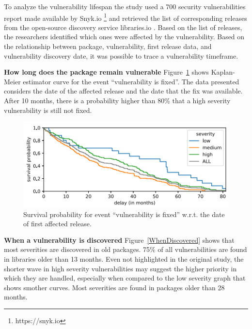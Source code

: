 \documentclass[pdf,bookmarks,colorlinks=true]{IEEEtran}
\begin{document}
To analyze the vulnerability lifespan the study \cite{Decan2018} used a 700 security vulnerabilities report made available by Snyk.io \footnote{https://snyk.io} and retrieved the list of corresponding releases from the open-source discovery service libraries.io \cite{Nesbitt2017}. Based on the list of releases, the researchers identified which ones were affected by the vulnerability.
Based on the relationship between package, vulnerability, first release data, and vulnerability discovery date, it was possible to trace a vulnerability timeframe.

\textbf{How long does the package remain vulnerable}
Figure~\ref{RemainsVulnerable} shows Kaplan-Meier estimator  curve \cite{Kaplan1958} for the event “vulnerability is fixed”. The data presented considers the date of the affected release and the date that the fix was available. After 10 months, there is a probability higher than 80\% that a high severity vulnerability is still not fixed.

\begin{figure}[h]
	\centering
	\includegraphics[scale=0.70]{RemainsVulnerable.png}
	\caption{Survival probability for event “vulnerability is fixed” w.r.t. the date of first affected release.}
	\label{RemainsVulnerable}
\end{figure}



\textbf{When a vulnerability is discovered}
Figure~\ref{WhenDiscovered} shows that most severities are discovered in old packages. 75\% of all vulnerabilities are found in libraries older than 13 months. Even not highlighted in the original study, the shorter wave in high severity vulnerabilities may suggest the higher priority in which they are handled, especially when compared to the low severity graph that shows smother curves. Most severities are found in packages older than 28 months.
\end{document}
